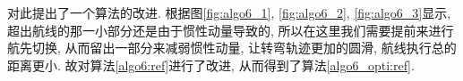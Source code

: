 \documentclass[UTF8,a4paper,10pt,nocolorlinks]{ctexart}
\begin{document}
    对此提出了一个算法的改进. 根据图\ref{fig:algo6_1}, \ref{fig:algo6_2}, \ref{fig:algo6_3}显示, 超出航线的那一小部分还是由于惯性动量导致的, 所以在这里我们需要提前来进行航先切换, 从而留出一部分来减弱惯性动量, 让转弯轨迹更加的圆滑, 航线执行总的距离更小. 故对算法\ref{algo6:ref}进行了改进, 从而得到了算法\ref{algo6_opti:ref}.   
    \begin{figure}[htbp]
        \centering
        \\
\end{figure}
\end{document}
